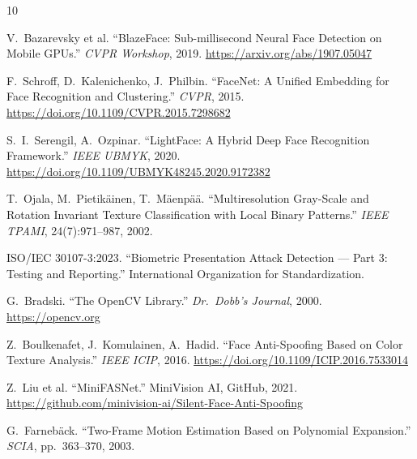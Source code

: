 \documentclass[10pt,a4paper]{article}
\begin{document}
\begin{thebibliography}{10}

V.~Bazarevsky et al. ``BlazeFace: Sub-millisecond Neural Face Detection on Mobile GPUs.''
\textit{CVPR Workshop}, 2019. \url{https://arxiv.org/abs/1907.05047}

F.~Schroff, D.~Kalenichenko, J.~Philbin. ``FaceNet: A Unified Embedding for Face Recognition and Clustering.''
\textit{CVPR}, 2015. \url{https://doi.org/10.1109/CVPR.2015.7298682}

S.~I.~Serengil, A.~Ozpinar. ``LightFace: A Hybrid Deep Face Recognition Framework.''
\textit{IEEE UBMYK}, 2020. \url{https://doi.org/10.1109/UBMYK48245.2020.9172382}

T.~Ojala, M.~Pietik\"{a}inen, T.~M\"{a}enp\"{a}\"{a}. ``Multiresolution Gray-Scale and Rotation Invariant Texture Classification with Local Binary Patterns.''
\textit{IEEE TPAMI}, 24(7):971--987, 2002.

ISO/IEC 30107-3:2023. ``Biometric Presentation Attack Detection --- Part 3: Testing and Reporting.''
International Organization for Standardization.

G.~Bradski. ``The OpenCV Library.'' \textit{Dr.\ Dobb's Journal}, 2000. \url{https://opencv.org}

Z.~Boulkenafet, J.~Komulainen, A.~Hadid. ``Face Anti-Spoofing Based on Color Texture Analysis.''
\textit{IEEE ICIP}, 2016. \url{https://doi.org/10.1109/ICIP.2016.7533014}

Z.~Liu et al. ``MiniFASNet.'' MiniVision AI, GitHub, 2021.
\url{https://github.com/minivision-ai/Silent-Face-Anti-Spoofing}

G.~Farneb\"{a}ck. ``Two-Frame Motion Estimation Based on Polynomial Expansion.''
\textit{SCIA}, pp.~363--370, 2003.

\end{thebibliography}
\end{document}
